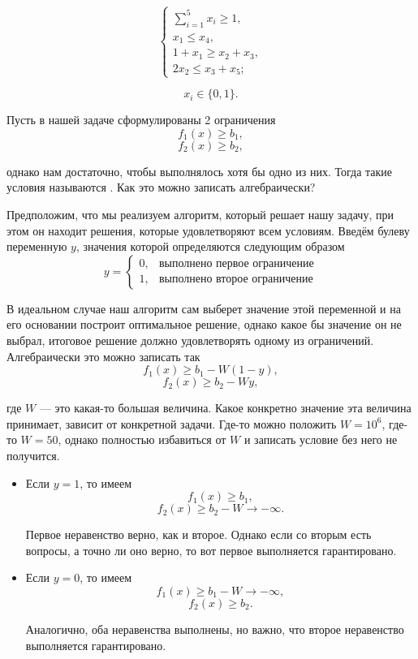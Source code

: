 \[
\begin{cases}
	\sum\limits_{i=1}^{5} x_i \ge 1, \\
	x_1 \le x_4, \\
	1 + x_1 \ge x_2 + x_3, \\
	2x_2 \le x_3 + x_5;
\end{cases}
\]

\[
x_i \in \{0, 1\}.
\]

\label{fact:alternative_conditions}

Пусть в нашей задаче сформулированы 2 ограничения
\[f_1(x) \ge b_1,\]
\[f_2(x) \ge b_2,\]

однако нам достаточно, чтобы выполнялось хотя бы одно из них. Тогда такие условия называются . Как это можно записать алгебраически?

Предположим, что мы реализуем алгоритм, который решает нашу задачу, при этом он находит решения, которые удовлетворяют всем условиям. Введём булеву переменную $y$, значения которой определяются следующим образом 
\[
y = \begin{cases}
	0,& \text{выполнено первое ограничение}\\
	1,&\text{выполнено второе ограничение}
\end{cases}
\]

В идеальном случае наш алгоритм сам выберет значение 
этой переменной и на его основании построит оптимальное решение, однако какое бы значение он не выбрал, итоговое решение должно удовлетворять одному из ограничений. Алгебраически это можно записать так
\[f_1(x) \ge b_1 - W(1-y),\]
\[f_2(x) \ge b_2 - Wy,\]

где $W$ --- это какая-то большая величина. Какое конкретно значение эта величина принимает, зависит от конкретной задачи. Где-то можно положить $W = 10^6$, где-то $W = 50$, однако полностью избавиться от $W$ и записать условие без него не получится.

\begin{itemize}[nosep]
	\item Если $y = 1$, то имеем
	\[f_1(x) \ge b_1,\]
	\[f_2(x) \ge b_2 - W \to -\infty.\]
	
	Первое неравенство верно, как и второе. Однако если со вторым есть вопросы, а точно ли оно верно, то вот первое выполняется гарантировано.
	
	\item Если $y = 0$, то имеем
	\[f_1(x) \ge b_1 - W \to -\infty,\]
	\[f_2(x) \ge b_2.\]
	
	Аналогично, оба неравенства выполнены, но важно, что второе неравенство выполняется гарантировано.
	
\end{itemize}

